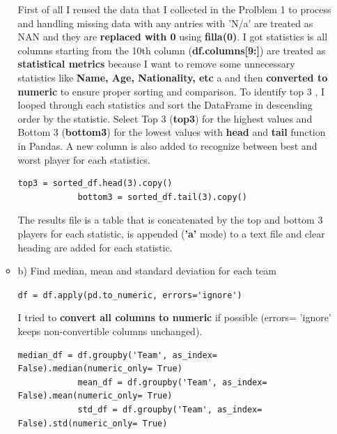 \documentclass[a4paper,12pt]{article}
\begin{document}
\begin{itemize}[label= {*}, leftmargin= 1cm]
\begin{itemize}[label= {}, leftmargin= 1cm]
        First of all I reused the data that I collected in the Prolblem 1 to process and handling missing data with any antries with 'N/a' are treated as NAN and they are \textbf{replaced with 0} using \textbf{filla(0)}. I got statistics is all columns starting from the 10th column (\textbf{df.columns[9:]}) are treated as \textbf{statistical metrics} because I want to remove some unnecessary statistics like \textbf{Name, Age, Nationality, etc} a and then \textbf{converted to numeric} to ensure proper sorting and comparison.
        \vspace{0.5cm}
        To identify top 3 , I looped through each statistics and sort the DataFrame in descending order by the statistic. Select Top 3 (\textbf{top3}) for the highest values and Bottom 3 (\textbf{bottom3}) for the lowest values with \textbf{head} and \textbf{tail} function in Pandas. A new column is also added to recognize between best and worst player for each statistics. 

        \begin{Verbatim}[fontsize=\footnotesize, xleftmargin=-1cm]
            top3 = sorted_df.head(3).copy()
            bottom3 = sorted_df.tail(3).copy()
        \end{Verbatim}

        The results file is a table that is concatenated by the top and bottom 3 players for each statistic, is appended (\textbf{'a'} mode) to a text file and clear heading are added for each statistic.
        \vspace{0.8cm}
        

        \item b) Find median, mean and standard deviation for each team 
        \vspace{0.5cm}
        
        \verb|df = df.apply(pd.to_numeric, errors='ignore')|
        
        I tried to \textbf{convert all columns to numeric} if possible (errors= 'ignore' keeps non-convertible columns unchanged). 

        \begin{Verbatim}[fontsize=\footnotesize, xleftmargin=-1cm]
            median_df = df.groupby('Team', as_index= False).median(numeric_only= True)
            mean_df = df.groupby('Team', as_index= False).mean(numeric_only= True)
            std_df = df.groupby('Team', as_index= False).std(numeric_only= True)
        \end{Verbatim}


\end{itemize}
\end{itemize}
\end{document}
